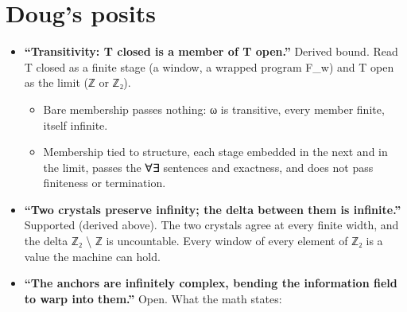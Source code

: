 \section{\texorpdfstring{Doug's posits}{Doug's posits}}

\begin{itemize}
\item \textbf{“Transitivity: T closed is a member of T open.”} Derived bound. Read T closed as a finite stage (a window, a wrapped program F\_\allowbreak{}w) and T open as the limit (ℤ or ℤ₂).

\begin{itemize}
\item Bare membership passes nothing: ω is transitive, every member finite, itself infinite.
\item Membership tied to structure, each stage embedded in the next and in the limit, passes the ∀∃ sentences and exactness, and does not pass finiteness or termination.
\end{itemize}
\item \textbf{“Two crystals preserve infinity; the delta between them is infinite.”} Supported (derived above). The two crystals agree at every finite width, and the delta ℤ₂ \textbackslash{} ℤ is uncountable. Every window of every element of ℤ₂ is a value the machine can hold.
\item \textbf{“The anchors are infinitely complex, bending the information field to warp into them.”} Open. What the math states:


\end{itemize}
